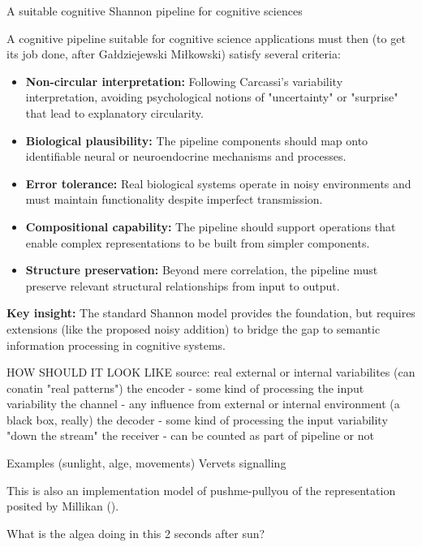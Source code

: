 \documentclass[10pt, aspectratio=169]{beamer}
\begin{document}
\begin{frame}{A suitable cognitive Shannon pipeline for cognitive sciences}
    
    A cognitive pipeline suitable for cognitive science applications must then (to get its job done, after Gałdziejewski Miłkowski) satisfy several criteria:
    
    \begin{itemize}
        \item \textbf{Non-circular interpretation:} Following Carcassi's variability interpretation, avoiding psychological notions of "uncertainty" or "surprise" that lead to explanatory circularity.
        
        \item \textbf{Biological plausibility:} The pipeline components should map onto identifiable neural or neuroendocrine mechanisms and processes.
        
       
        
        \item \textbf{Error tolerance:} Real biological systems operate in noisy environments and must maintain functionality despite imperfect transmission.
        
        \item \textbf{Compositional capability:} The pipeline should support operations that enable complex representations to be built from simpler components.
         
        \item \textbf{Structure preservation:} Beyond mere correlation, the pipeline must preserve relevant structural relationships from input to output.
    \end{itemize}
    
    \textbf{Key insight:} The standard Shannon model provides the foundation, but requires extensions (like the proposed noisy addition) to bridge the gap to semantic information processing in cognitive systems.

    
\end{frame}



\begin{frame}

    HOW SHOULD IT LOOK LIKE 
    source: real external or internal variabilites (can conatin "real patterns")
    the encoder - some kind of processing the input variability
    the channel - any influence from external or internal environment (a black box, really)
    the decoder - some kind of processing the input variability "down the stream"
    the receiver - can be counted as part of pipeline or not

    Examples (sunlight, alge, movements)
    Vervets signalling

    This is also an implementation model of pushme-pullyou of the representation posited by Millikan
    (\cite{millikan_pushme-pullyou_2017}).

    What is the algea doing in this 2 seconds after sun? 
    
\end{frame}
\end{document}
